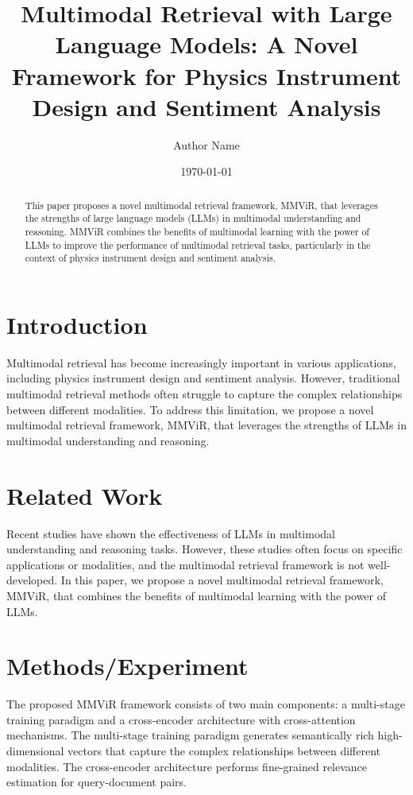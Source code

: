 \documentclass{article}
\title{Multimodal Retrieval with Large Language Models: A Novel Framework for Physics Instrument Design and Sentiment Analysis}
\author{Author Name}
\date{\today}
\begin{document}
\maketitle

\begin{abstract}
This paper proposes a novel multimodal retrieval framework, MMViR, that leverages the strengths of large language models (LLMs) in multimodal understanding and reasoning. MMViR combines the benefits of multimodal learning with the power of LLMs to improve the performance of multimodal retrieval tasks, particularly in the context of physics instrument design and sentiment analysis.
\end{abstract}

\section{Introduction}
Multimodal retrieval has become increasingly important in various applications, including physics instrument design and sentiment analysis. However, traditional multimodal retrieval methods often struggle to capture the complex relationships between different modalities. To address this limitation, we propose a novel multimodal retrieval framework, MMViR, that leverages the strengths of LLMs in multimodal understanding and reasoning.

\section{Related Work}
Recent studies have shown the effectiveness of LLMs in multimodal understanding and reasoning tasks. However, these studies often focus on specific applications or modalities, and the multimodal retrieval framework is not well-developed. In this paper, we propose a novel multimodal retrieval framework, MMViR, that combines the benefits of multimodal learning with the power of LLMs.

\section{Methods/Experiment}
The proposed MMViR framework consists of two main components: a multi-stage training paradigm and a cross-encoder architecture with cross-attention mechanisms. The multi-stage training paradigm generates semantically rich high-dimensional vectors that capture the complex relationships between different modalities. The cross-encoder architecture performs fine-grained relevance estimation for query-document pairs.
\end{document}
